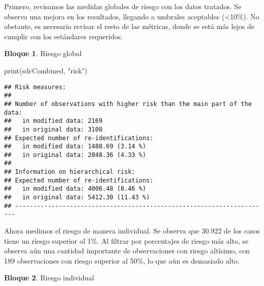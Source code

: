 \documentclass[
]{book}
\newenvironment{Shaded}{\begin{snugshade}}{\end{snugshade}}
\newcommand{\CommentTok}[1]{\textcolor[rgb]{0.56,0.35,0.01}{\textit{#1}}}
\newcommand{\FloatTok}[1]{\textcolor[rgb]{0.00,0.00,0.81}{#1}}
\newcommand{\FunctionTok}[1]{\textcolor[rgb]{0.00,0.00,0.00}{#1}}
\newcommand{\NormalTok}[1]{#1}
\newcommand{\SpecialCharTok}[1]{\textcolor[rgb]{0.00,0.00,0.00}{#1}}
\newcommand{\StringTok}[1]{\textcolor[rgb]{0.31,0.60,0.02}{#1}}
\theoremstyle{definition}
\theoremstyle{definition}
\newtheorem{example}{Bloque}[chapter]
\theoremstyle{definition}
\theoremstyle{definition}
\theoremstyle{remark}
\begin{document}
Primero, revisamos las medidas globales de riesgo con los datos tratados. Se observa una mejora en los resultados, llegando a umbrales aceptables (\textless10\%). No obstante, es necesario revisar el resto de las métricas, donde se está más lejos de cumplir con los estándares requeridos.

\begin{example}
\protect\hypertarget{exm:bloque54nbm}{}\label{exm:bloque54nbm}Riesgo global
\end{example}

\begin{Shaded}
\begin{Highlighting}[]
\FunctionTok{print}\NormalTok{(sdcCombined, }\StringTok{"risk"}\NormalTok{)}
\end{Highlighting}
\end{Shaded}

\begin{verbatim}
## Risk measures:
## 
## Number of observations with higher risk than the main part of the data: 
##   in modified data: 2169
##   in original data: 3108
## Expected number of re-identifications: 
##   in modified data: 1488.69 (3.14 %)
##   in original data: 2048.36 (4.33 %)
## 
## Information on hierarchical risk:
## Expected number of re-identifications: 
##   in modified data: 4006.48 (8.46 %)
##   in original data: 5412.30 (11.43 %)
## ----------------------------------------------------------------------
\end{verbatim}

Ahora medimos el riesgo de manera individual. Se observa que 30.922 de los casos tiene un riesgo superior al 1\%. Al filtrar por porcentajes de riesgo más alto, se observa aún una cantidad importante de observaciones con riesgo altísimo, con 189 observaciones con riesgo superior al 50\%, lo que aún es demasiado alto.

\begin{example}
\protect\hypertarget{exm:bloque55nbm}{}\label{exm:bloque55nbm}Riesgo individual
\end{example}

\begin{Shaded}
\end{Shaded}
\end{document}

